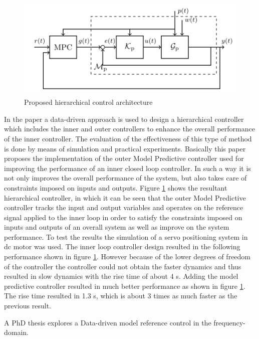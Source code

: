 \documentclass[]{final_report}
\begin{document}
\begin{figure} [h!]
\centerline{\includegraphics[width=.75\textwidth]{Screenshots for related work/constraint_data_driven_control_screenshot1.png}}
\caption{Proposed hierarchical control architecture
\cite{piga2017direct}}
\label{fig:hierarchicalcontroller}
\end{figure}

In the paper \cite{piga2017direct} a data-driven approach is used to design a hierarchical controller which includes the inner and outer controllers to enhance the overall performance of the inner controller. The evaluation of the effectiveness of this type of method is done by means of simulation and practical experiments. Basically this paper proposes the implementation of the outer Model Predictive controller used for improving the performance of an inner closed loop controller. In such a way it is not only improves the overall performance of the system, but also takes care of constraints imposed on inputs and outputs. Figure \ref{fig:hierarchicalcontroller} shows the resultant hierarchical controller, in which it can be seen that the outer Model Predictive controller tracks the input and output variables and operates on the reference signal applied to the inner loop in order to satisfy the constraints imposed on inputs and outputs of an overall system as well as improve on the system performance. To test the results the simulation of a servo positioning system in dc motor was used. The inner loop controller design resulted in the following performance shown in figure \ref{fig:hierarchicalcontroller}. However because of the lower degrees of freedom of the controller the controller could not obtain the faster dynamics and thus resulted in slow dynamics with the rise time of about 4 s. Adding the model predictive controller resulted in much better performance as shown in figure \ref{fig:hierarchicalcontroller}. The rise time resulted in 1.3 s, which is about 3 times as much faster as the previous result. 


A PhD thesis \cite{kergus} explores a Data-driven model reference control in the frequency-domain. 
\end{document}
